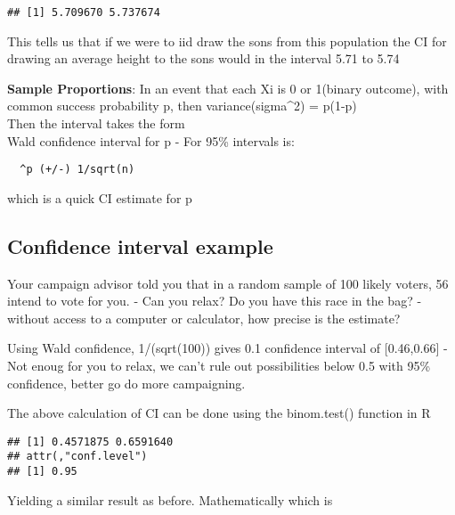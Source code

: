 \documentclass[
]{article}
\newenvironment{Shaded}{\begin{snugshade}}{\end{snugshade}}
\newcommand{\DecValTok}[1]{\textcolor[rgb]{0.00,0.00,0.81}{#1}}
\newcommand{\KeywordTok}[1]{\textcolor[rgb]{0.13,0.29,0.53}{\textbf{#1}}}
\newcommand{\NormalTok}[1]{#1}
\newcommand{\OperatorTok}[1]{\textcolor[rgb]{0.81,0.36,0.00}{\textbf{#1}}}
\begin{document}
\begin{verbatim}
## [1] 5.709670 5.737674
\end{verbatim}

This tells us that if we were to iid draw the sons from this population
the CI for drawing an average height to the sons would in the interval
5.71 to 5.74

\textbf{Sample Proportions}: In an event that each Xi is 0 or 1(binary
outcome), with common success probability p, then variance(sigma\^{}2) =
p(1-p)\\
Then the interval takes the form\\
Wald confidence interval for p - For 95\% intervals is:

\begin{verbatim}
  ^p (+/-) 1/sqrt(n)
\end{verbatim}

which is a quick CI estimate for p

\hypertarget{confidence-interval-example}{%
\subsection{Confidence interval
example}\label{confidence-interval-example}}

Your campaign advisor told you that in a random sample of 100 likely
voters, 56 intend to vote for you. - Can you relax? Do you have this
race in the bag? - without access to a computer or calculator, how
precise is the estimate?

Using Wald confidence, 1/(sqrt(100)) gives 0.1 confidence interval of
{[}0.46,0.66{]} - Not enoug for you to relax, we can't rule out
possibilities below 0.5 with 95\% confidence, better go do more
campaigning.

The above calculation of CI can be done using the binom.test() function
in R

\begin{Shaded}
\end{Shaded}

\begin{verbatim}
## [1] 0.4571875 0.6591640
## attr(,"conf.level")
## [1] 0.95
\end{verbatim}

Yielding a similar result as before. Mathematically which is
\end{document}
